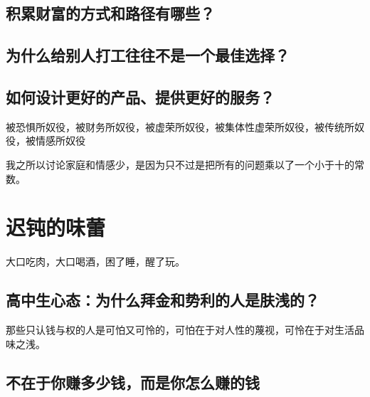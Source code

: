 \subsection{积累财富的方式和路径有哪些？}
\subsection{为什么给别人打工往往不是一个最佳选择？}
\subsection{如何设计更好的产品、提供更好的服务？}

被恐惧所奴役，被财务所奴役，被虚荣所奴役，被集体性虚荣所奴役，被传统所奴役，被情感所奴役

我之所以讨论家庭和情感少，是因为只不过是把所有的问题乘以了一个小于十的常数。

\section{迟钝的味蕾}
大口吃肉，大口喝酒，困了睡，醒了玩。
\subsection{高中生心态：为什么拜金和势利的人是肤浅的？}

那些只认钱与权的人是可怕又可怜的，可怕在于对人性的蔑视，可怜在于对生活品味之浅。

\subsection{不在于你赚多少钱，而是你怎么赚的钱}
